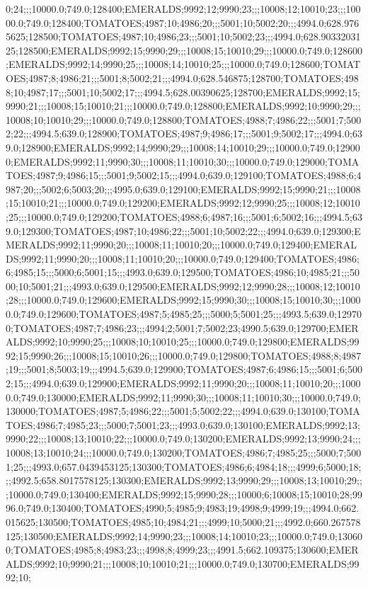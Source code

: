 0;24;;;10000.0;749.0;128400;EMERALDS;9992;12;9990;23;;;10008;12;10010;23;;;10000.0;749.0;128400;TOMATOES;4987;10;4986;20;;;5001;10;5002;20;;;4994.0;628.9765625;128500;TOMATOES;4987;10;4986;23;;;5001;10;5002;23;;;4994.0;628.9033203125;128500;EMERALDS;9992;15;9990;29;;;10008;15;10010;29;;;10000.0;749.0;128600;EMERALDS;9992;14;9990;25;;;10008;14;10010;25;;;10000.0;749.0;128600;TOMATOES;4987;8;4986;21;;;5001;8;5002;21;;;4994.0;628.546875;128700;TOMATOES;4988;10;4987;17;;;5001;10;5002;17;;;4994.5;628.00390625;128700;EMERALDS;9992;15;9990;21;;;10008;15;10010;21;;;10000.0;749.0;128800;EMERALDS;9992;10;9990;29;;;10008;10;10010;29;;;10000.0;749.0;128800;TOMATOES;4988;7;4986;22;;;5001;7;5002;22;;;4994.5;639.0;128900;TOMATOES;4987;9;4986;17;;;5001;9;5002;17;;;4994.0;639.0;128900;EMERALDS;9992;14;9990;29;;;10008;14;10010;29;;;10000.0;749.0;129000;EMERALDS;9992;11;9990;30;;;10008;11;10010;30;;;10000.0;749.0;129000;TOMATOES;4987;9;4986;15;;;5001;9;5002;15;;;4994.0;639.0;129100;TOMATOES;4988;6;4987;20;;;5002;6;5003;20;;;4995.0;639.0;129100;EMERALDS;9992;15;9990;21;;;10008;15;10010;21;;;10000.0;749.0;129200;EMERALDS;9992;12;9990;25;;;10008;12;10010;25;;;10000.0;749.0;129200;TOMATOES;4988;6;4987;16;;;5001;6;5002;16;;;4994.5;639.0;129300;TOMATOES;4987;10;4986;22;;;5001;10;5002;22;;;4994.0;639.0;129300;EMERALDS;9992;11;9990;20;;;10008;11;10010;20;;;10000.0;749.0;129400;EMERALDS;9992;11;9990;20;;;10008;11;10010;20;;;10000.0;749.0;129400;TOMATOES;4986;6;4985;15;;;5000;6;5001;15;;;4993.0;639.0;129500;TOMATOES;4986;10;4985;21;;;5000;10;5001;21;;;4993.0;639.0;129500;EMERALDS;9992;12;9990;28;;;10008;12;10010;28;;;10000.0;749.0;129600;EMERALDS;9992;15;9990;30;;;10008;15;10010;30;;;10000.0;749.0;129600;TOMATOES;4987;5;4985;25;;;5000;5;5001;25;;;4993.5;639.0;129700;TOMATOES;4987;7;4986;23;;;4994;2;5001;7;5002;23;4990.5;639.0;129700;EMERALDS;9992;10;9990;25;;;10008;10;10010;25;;;10000.0;749.0;129800;EMERALDS;9992;15;9990;26;;;10008;15;10010;26;;;10000.0;749.0;129800;TOMATOES;4988;8;4987;19;;;5001;8;5003;19;;;4994.5;639.0;129900;TOMATOES;4987;6;4986;15;;;5001;6;5002;15;;;4994.0;639.0;129900;EMERALDS;9992;11;9990;20;;;10008;11;10010;20;;;10000.0;749.0;130000;EMERALDS;9992;11;9990;30;;;10008;11;10010;30;;;10000.0;749.0;130000;TOMATOES;4987;5;4986;22;;;5001;5;5002;22;;;4994.0;639.0;130100;TOMATOES;4986;7;4985;23;;;5000;7;5001;23;;;4993.0;639.0;130100;EMERALDS;9992;13;9990;22;;;10008;13;10010;22;;;10000.0;749.0;130200;EMERALDS;9992;13;9990;24;;;10008;13;10010;24;;;10000.0;749.0;130200;TOMATOES;4986;7;4985;25;;;5000;7;5001;25;;;4993.0;657.0439453125;130300;TOMATOES;4986;6;4984;18;;;4999;6;5000;18;;;4992.5;658.8017578125;130300;EMERALDS;9992;13;9990;29;;;10008;13;10010;29;;;10000.0;749.0;130400;EMERALDS;9992;15;9990;28;;;10000;6;10008;15;10010;28;9996.0;749.0;130400;TOMATOES;4990;5;4985;9;4983;19;4998;9;4999;19;;;4994.0;662.015625;130500;TOMATOES;4985;10;4984;21;;;4999;10;5000;21;;;4992.0;660.267578125;130500;EMERALDS;9992;14;9990;23;;;10008;14;10010;23;;;10000.0;749.0;130600;TOMATOES;4985;8;4983;23;;;4998;8;4999;23;;;4991.5;662.109375;130600;EMERALDS;9992;10;9990;21;;;10008;10;10010;21;;;10000.0;749.0;130700;EMERALDS;9992;10;